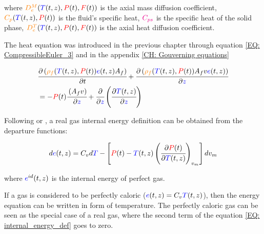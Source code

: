 \documentclass[../Article_Model_Parameters.tex]{subfiles}
\begin{document}
		where $ {\color{orange}D^M_e}({\color{blue}T}(t,z),{\color{red}P}(t),{\color{red}F}(t))$ is the axial mass diffusion coefficient, ${\color{orange}C_p}({\color{blue}T}(t,z),{\color{red}P}(t))$ is the fluid's specific heat, ${\color{magenta}C_{ps}}$ is the specific heat of the solid phase, ${\color{orange}D^T_e}({\color{blue}T}(t,z),{\color{red}P}(t),{\color{red}F}(t))$ is the axial heat diffusion coefficient. 

		\fi
		
			The heat equation was introduced in the previous chapter through equation \ref{EQ: CompressibleEuler_3} and in the appendix \ref{CH: Gouverning equations} 
			
			{\footnotesize
			\begin{align}
				&\cfrac{\partial \left( {\color{orange}\rho_f}({\color{blue}T}(t,z),{\color{red}P}(t)) {\color{blue}e}(t,z) A_f \right) }{\partial t} + \cfrac{\partial \left( {\color{orange}\rho_f}({\color{blue}T}(t,z),{\color{red}P}(t)) A_f v {\color{blue}e}(t,z) \right)}{\partial {\color{blue}z}} \nonumber \\
				&= -{\color{red}P}(t)\cfrac{\left( A_f v \right)}{\partial {\color{blue}z}} + \cfrac{\partial}{\partial {\color{blue}z}} \left( \cfrac{\partial {\color{blue}T}(t,z)}{\partial {\color{blue}z}} \right) 
			\end{align}
			}
		
			Following \citet{Elliott2011} or \citet{Gmehling2019}, a real gas internal energy definition can be obtained from the departure functions:

			{\footnotesize
				\begin{equation}
					d{\color{blue}e}(t,z)=C_vd{\color{blue}T}-\left[{\color{red}P}(t)-{\color{blue}T}(t,z)\left(\cfrac{\partial {\color{red}P}(t)}{\partial {\color{blue}T}(t,z)}\right)_{v_m}\right]dv_m
					\label{EQ: internal_energy_def}
				\end{equation} }
			
			where ${\color{blue}e}^{id}(t,z)$ is the internal energy of perfect gas.
			
			If a gas is considered to be perfectly caloric (${\color{blue}e}(t,z)=C_v {\color{blue}T}(t,z)$), then the energy equation can be written in form of temperature. The perfectly caloric gas can be seen as the special case of a real gas, where the second term of the equation \ref{EQ: internal_energy_def} goes to zero.
			
\end{document}
